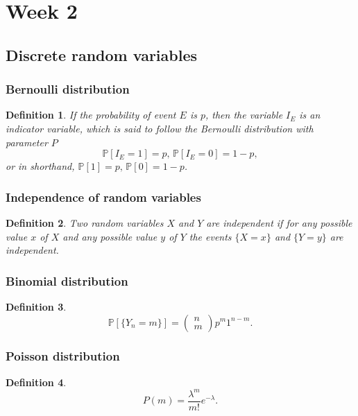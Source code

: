 \documentclass{article}
\newtheorem{definition}{Definition}
\newcommand{\Prob}{\mathbb{P}}
\begin{document}
\section{Week 2}
\subsection{Discrete random variables}
\subsubsection{Bernoulli distribution}
\begin{definition}
    If the probability of event $E$ is $p$, then the variable $I_E$ is an indicator variable, which is said to follow the Bernoulli distribution with parameter $P$
    \begin{equation}
        \Prob[I_E=1]=p,\,\Prob[I_E=0]=1-p,
    \end{equation}
    or in shorthand, $\Prob[1]=p,\,\Prob[0]=1-p$.
\end{definition}

\subsubsection{Independence of random variables}
\begin{definition}
    Two random variables $X$ and $Y$ are independent if for any possible value $x$ of $X$ and any possible value $y$ of $Y$ the events $\{X=x\}$ and $\{Y=y\}$ are independent.
\end{definition}

\subsubsection{Binomial distribution}
\begin{definition}
    \begin{equation}
        \Prob[\{ Y_n=m \}] = \begin{pmatrix} n \\ m \end{pmatrix}p^m1^{n-m}.
    \end{equation}
\end{definition}

\subsubsection{Poisson distribution}
\begin{definition}
    \begin{equation}
        P(m) = \frac{\lambda^m}{m!}e^{-\lambda}.
    \end{equation}
\end{definition}
\end{document}
